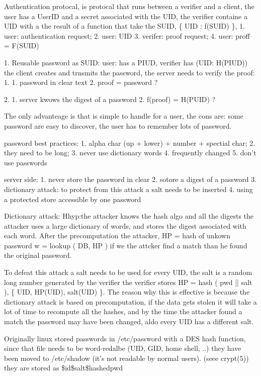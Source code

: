 \documentclass[12pt]{article}
\begin{document}
Authentication protocal, is protocal that runs between a verifier and a client, the user has a UserID  and a secret associated with the UID, the verifier containe a UID with a the result of a function that take the SUID, \{ UID : f(SUID) \},
1. user: authentication request;
2. user: UID
3. verifer: proof request;
4. user: proff = F(SUID)

1. Reusable password as SUID:
user: has a PIUD, verifier has (UID: H(PIUD))
the client creates and trnsmits the password, 
the server needs to verify the proof:
1.
1. password in clear text
2. proof = password ?

2.
1. server kwows the digest of a password
2. f(proof) = H(PUID) ? 

The only advanteage is that is simple to handle for a user, the cons are: some password are easy to discover, the user has to remember lots of password.

password best practices:
1. alpha char (up + lower) + number + spectial char;
2. they need to be long;
3. never use dictionary words
4. frequently changed
5. don't use passwords

server side:
1. never store the password in clear
2. sotore a digest of a password
3. dictionary attack: to protect from this attack a salt needs to be inserted
4. using a protected store accessible by one password


Dictionary attack:
Hhyp:the attacker knows the hash algo and all the digests
the attacker uses a large dictionary of words, and stores the digest associated with each word.
After the precomputation the attacker, HP = hash of unkown password
w = lookup ( DB, HP )
if we the attcker find a match than he found the original password.

To defeat this attack a salt needs to be used for every UID, the salt is a random long number generated by the verifier
the verifier stores HP = hash ( pwd || salt ),  \{ UID, HP(UID), salt(UID) \}.
The reason why this is effective is because the dictionary attack is based on precomputation, if the data gets stolen it will take a lot of time to recompute all the hashes, and by the time the attacker found a match the password may have been changed, aldo every UID has a different salt.

Originally linux stored passwords in /etc/password with a DES hash function, since that file needs to be word-redalbe (UID, GID, home shell, ..) they have been moved to /etc/shadow (it's not readable by normal users). (seee crypt(5))
they are stored as \$id\$salt\$hashedpwd
\end{document}
